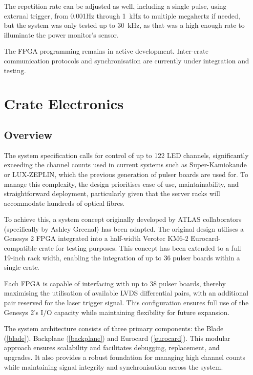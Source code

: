 \documentclass[a4paper,11pt]{article}
\begin{document}
The repetition rate can be adjusted as well, including a single pulse, using external trigger, from 0.001Hz through 1~kHz to multiple megahertz if needed, but the system was only tested up to  30~kHz, as that was a high enough rate to illuminate the power monitor's sensor.

The FPGA programming remains in active development. Inter-crate communication protocols and synchronisation are currently under integration and testing.

\section{Crate Electronics}\label{sec:crate}

\subsection{Overview}

The system specification calls for control of up to 122 LED channels, significantly exceeding the channel counts used in current systems such as Super-Kamiokande or LUX-ZEPLIN, which the previous generation of pulser boards are used for. To manage this complexity, the design prioritises ease of use, maintainability, and straightforward deployment, particularly given that the server racks will accommodate hundreds of optical fibres.

To achieve this, a system concept originally developed by ATLAS collaborators (specifically by Ashley Greenal) has been adapted. The original design utilises a Genesys 2 FPGA integrated into a half-width Verotec KM6-2 \cite{KM6-2} Eurocard-compatible crate for testing purposes. This concept has been extended to a full 19-inch rack width, enabling the integration of up to 36 pulser boards within a single crate.

Each FPGA is capable of interfacing with up to 38 pulser boards, thereby maximising the utilisation of available LVDS differential pairs, with an additional pair reserved for the laser trigger signal. This configuration ensures full use of the Genesys 2’s I/O capacity while maintaining flexibility for future expansion.

The system architecture consists of three primary components: the Blade (\cref{blade}), Backplane (\cref{backplane}) and Eurocard (\cref{eurocard}). This modular approach ensures scalability and facilitates debugging, replacement, and upgrades. It also provides a robust foundation for managing high channel counts while maintaining signal integrity and synchronisation across the system.
\end{document}
